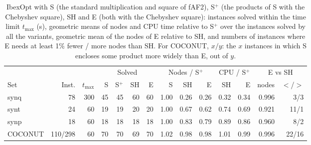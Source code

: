 \documentclass[11pt]{article}
\theoremstyle{definition}
\begin{document}
\begin{table}[t]
\centering
\caption{IbexOpt with S (the standard multiplication and square of fAF2), S$^+$ (the products of S with the Chebyshev square), SH and E (both with the Chebyshev square): instances solved within the time limit $t_{\max}$ (s), geometric means of nodes and CPU time relative to S$^+$ over the instances solved by all the variants, geometric mean of the nodes of E relative to SH, and numbers of instances where E needs at least 1\% fewer / more nodes than SH. For COCONUT, $x/y$: the $x$ instances in which S encloses some product more widely than E, out of $y$.}
\label{tab:solver}
\small
\setlength{\tabcolsep}{3.5pt}
\begin{tabular}{lrrrrrrrrrrrrr}
\toprule
 & & & \multicolumn{4}{c}{Solved} & \multicolumn{3}{c}{Nodes / S$^+$} & \multicolumn{2}{c}{CPU / S$^+$} & \multicolumn{2}{c}{E vs SH} \\
\cmidrule(lr){4-7}\cmidrule(lr){8-10}\cmidrule(lr){11-12}\cmidrule(lr){13-14}
Set & Inst. & $t_{\max}$ & S & S$^+$ & SH & E & S & SH & E & SH & E & nodes & $<$/$>$ \\
\midrule
synq & 78 & 300 & 45 & 45 & 60 & 60 & 1.00 & 0.26 & 0.26 & 0.32 & 0.34 & 0.996 & 3/3 \\
synt & 24 & 60 & 19 & 19 & 20 & 20 & 1.00 & 0.67 & 0.62 & 0.74 & 0.69 & 0.921 & 11/1 \\
synp & 18 & 60 & 18 & 18 & 18 & 18 & 1.00 & 0.83 & 0.79 & 0.89 & 0.86 & 0.960 & 8/2 \\
COCONUT & 110/298 & 60 & 70 & 70 & 69 & 70 & 1.02 & 0.98 & 0.98 & 1.01 & 0.99 & 0.996 & 22/16 \\
\bottomrule
\end{tabular}
\end{table}
\end{document}

